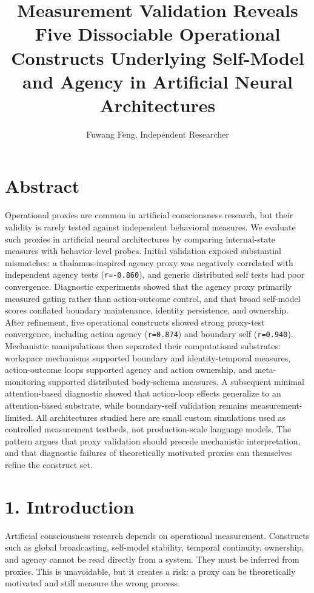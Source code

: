 \documentclass[
  11pt,
  letterpaper,
]{article}
\title{Measurement Validation Reveals Five Dissociable Operational
Constructs Underlying Self-Model and Agency in Artificial Neural
Architectures}
\author{Fuwang Feng, Independent Researcher}
\date{}
\begin{document}
\maketitle

\section{Abstract}\label{abstract}

Operational proxies are common in artificial consciousness research, but
their validity is rarely tested against independent behavioral measures.
We evaluate such proxies in artificial neural architectures by comparing
internal-state measures with behavior-level probes. Initial validation
exposed substantial mismatches: a thalamus-inspired agency proxy was
negatively correlated with independent agency tests (\texttt{r=-0.860}),
and generic distributed self tests had poor convergence. Diagnostic
experiments showed that the agency proxy primarily measured gating
rather than action-outcome control, and that broad self-model scores
conflated boundary maintenance, identity persistence, and ownership.
After refinement, five operational constructs showed strong proxy-test
convergence, including action agency (\texttt{r=0.874}) and boundary
self (\texttt{r=0.940}). Mechanistic manipulations then separated their
computational substrates: workspace mechanisms supported boundary and
identity-temporal measures, action-outcome loops supported agency and
action ownership, and meta-monitoring supported distributed body-schema
measures. A subsequent minimal attention-based diagnostic showed that
action-loop effects generalize to an attention-based substrate, while
boundary-self validation remains measurement-limited. All architectures
studied here are small custom simulations used as controlled measurement
testbeds, not production-scale language models. The pattern argues that
proxy validation should precede mechanistic interpretation, and that
diagnostic failures of theoretically motivated proxies can themselves
refine the construct set.

\section{1. Introduction}\label{introduction}

Artificial consciousness research depends on operational measurement.
Constructs such as global broadcasting, self-model stability, temporal
continuity, ownership, and agency cannot be read directly from a system.
They must be inferred from proxies. This is unavoidable, but it creates
a risk: a proxy can be theoretically motivated and still measure the
wrong process.
\end{document}
